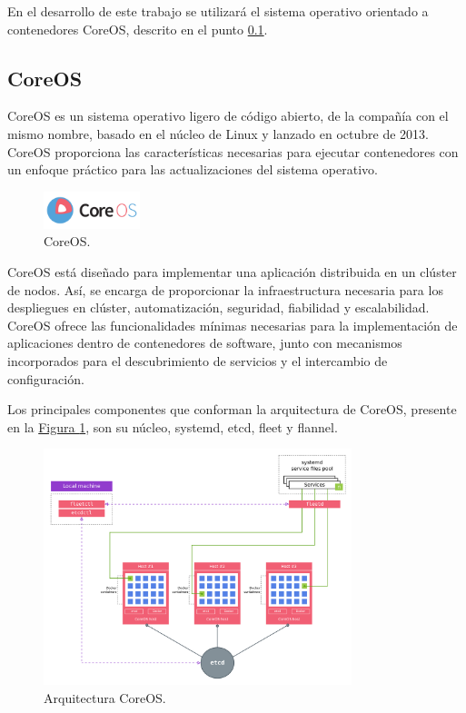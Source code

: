 En el desarrollo de este trabajo se utilizará el sistema operativo orientado a contenedores CoreOS, descrito en el punto \hyperref[CoreOS]{\ref{CoreOS}}.

\subsection{CoreOS}\label{CoreOS}

CoreOS es un sistema operativo ligero de código abierto, de la compañía con el mismo nombre, basado en el núcleo de Linux y lanzado en octubre de 2013. CoreOS proporciona las características necesarias para ejecutar contenedores con un enfoque práctico para las actualizaciones del sistema operativo.

\begin{figure}[H]
\centering
\includegraphics[width=0.25\textwidth]{images/figures/coreos.png}
\caption{CoreOS.\footnotemark}
\end{figure}


CoreOS está diseñado para implementar una aplicación distribuida en un clúster de nodos. Así, se encarga de proporcionar la infraestructura necesaria para los despliegues en clúster, automatización, seguridad, fiabilidad y escalabilidad. CoreOS ofrece las funcionalidades mínimas necesarias para la implementación de aplicaciones dentro de contenedores de software, junto con mecanismos incorporados para el descubrimiento de servicios y el intercambio de configuración.

Los principales componentes que conforman la arquitectura de CoreOS, presente en la \hyperref[fig:CoreOSarchitecture]{Figura \ref{fig:CoreOSarchitecture}}, son su núcleo, systemd\cite{coreossystemd}, etcd\cite{etcd}, fleet\cite{fleet} y flannel\cite{flannel}.

\begin{figure}[H]
\centering
\includegraphics[width=0.8\textwidth]{images/figures/coreosarchitecture.png}
\caption{Arquitectura CoreOS.\footnotemark \label{fig:CoreOSarchitecture}}
\end{figure}

